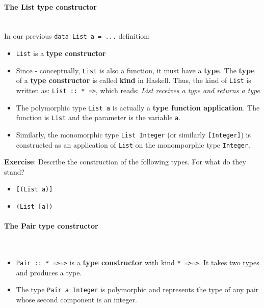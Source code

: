 \paragraph{ The List type constructor }\hfill\\

In our previous \texttt{data List a = ...} definition:
\begin{itemize}
	\item  \texttt{List} is a \textbf{type constructor}
	\item  Since - conceptually, \texttt{List} is also a function, it must have a \textbf{type}. The \textbf{type} of a \textbf{type constructor} is called \textbf{kind} in Haskell. Thus, the kind of \texttt{List} is written as: \texttt{List :: * =\textgreater  *}, which reads: \textit{List receives a type and returns a type}
	\item  The polymorphic type \texttt{List a} is actually a \textbf{type function application}. The function is \texttt{List} and the parameter is the variable \texttt{a}.
	\item  Similarly, the monomorphic type \texttt{List Integer} (or similarly \texttt{[Integer]}) is constructed as an application of \texttt{List} on the monomporphic type \texttt{Integer}.
\end{itemize}

\textbf{Exercise}: Describe the construction of the following types. For what do they stand?
\begin{itemize}
	\item  \texttt{[(List a)]}
	\item  \texttt{(List [a])}
\end{itemize}

\paragraph{ The Pair type constructor }\hfill\\

\begin{itemize}
	\item  \texttt{Pair :: * =\textgreater  * =\textgreater  *} is a \textbf{type constructor} with kind \texttt{* =\textgreater  * =\textgreater  *}. It takes two types and produces a type.
	\item  The type \texttt{Pair a Integer} is polymorphic and represents the type of any pair whose second component is an integer.
\end{itemize}

